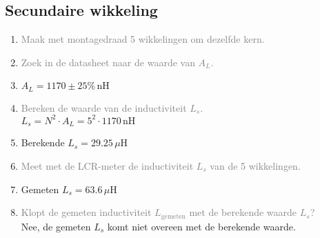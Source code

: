 \subsection{Secundaire wikkeling}
\begin{enumerate}
    \item \textcolor{gray}{Maak met montagedraad 5 wikkelingen om dezelfde kern.}
    \item \textcolor{gray}{Zoek in de datasheet naar de waarde van \( A_L \).}
    \item \( A_L = 1170 \pm 25\% \, \text{nH} \)
    \item \textcolor{gray}{Bereken de waarde van de inductiviteit \( L_s \).}
    \\ \( L_s = N^2 \cdot A_L = 5^2 \cdot 1170 \, \text{nH} \)
    \item Berekende \( L_s = 29.25 \, \mu \text{H} \)
    \item \textcolor{gray}{Meet met de LCR-meter de inductiviteit \( L_s \) van de 5 wikkelingen.}
    \item Gemeten \( L_s = 63.6 \, \mu \text{H} \)
    \item \textcolor{gray}{Klopt de gemeten inductiviteit \( L_{\text{gemeten}} \) met de berekende waarde \( L_s \)?}
    \\ Nee, de gemeten \( L_s \) komt niet overeen met de berekende waarde.
\end{enumerate}
